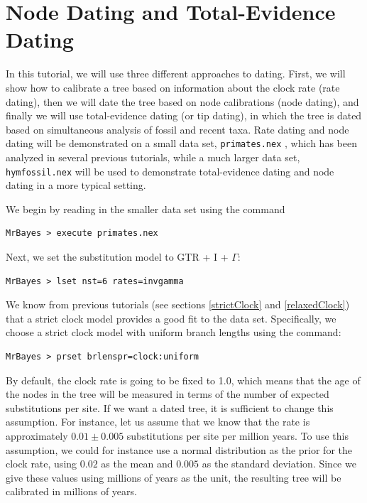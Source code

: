 \documentclass[12pt]{book}
\newcommand{\ttt}[1]{\texttt{#1} }
\begin{document}
\section{Node Dating and Total-Evidence Dating}

In this tutorial, we will use three different approaches to dating. First, we will show how to
calibrate a tree based on information about the clock rate (rate dating), then we will date the
tree based on node calibrations (node dating), and finally we will use total-evidence dating (or
tip dating), in which the tree is dated based on simultaneous analysis of fossil and recent taxa.
Rate dating and node dating will be demonstrated on a small data set, \ttt{primates.nex}, which
has been analyzed in several previous tutorials, while a much larger data set,
\ttt{hymfossil.nex} will be used to demonstrate total-evidence dating and node dating in a more
typical setting.

We begin by reading in the smaller data set using the command

\begin{verbatim}
MrBayes > execute primates.nex
\end{verbatim}

Next, we set the substitution model to GTR + I + $\Gamma$:

\begin{verbatim}
MrBayes > lset nst=6 rates=invgamma
\end{verbatim}

We know from previous tutorials (see sections \ref{strictClock} and \ref{relaxedClock}) that a
strict clock model provides a good fit to the data set. Specifically, we choose a strict clock
model with uniform branch lengths using the command:

\begin{verbatim}
MrBayes > prset brlenspr=clock:uniform
\end{verbatim}

By default, the clock rate is going to be fixed to 1.0, which means that the age of the nodes in
the tree will be measured in terms of the number of expected substitutions per site. If we want a
dated tree, it is sufficient to change this assumption. For instance, let us assume that we know
that the rate is approximately $0.01 \pm 0.005$ substitutions per site per million years. To use
this assumption, we could for instance use a normal distribution as the prior for the clock rate,
using $0.02$ as the mean and $0.005$ as the standard deviation. Since we give these values using
millions of years as the unit, the resulting tree will be calibrated in millions of years.
\end{document}
